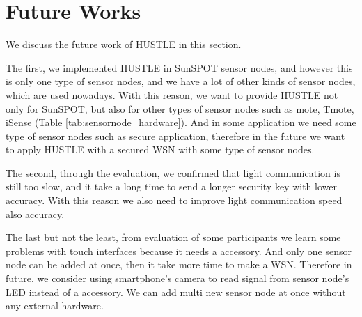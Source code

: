 \section{Future Works}\label{sec:conc_future}

We discuss the future work of HUSTLE in this section. 

The first, we implemented HUSTLE in SunSPOT sensor nodes, and however this is only one type of sensor nodes, and we have a lot of other kinds of sensor nodes, which are used nowadays. With this reason, we want to provide HUSTLE not only for SunSPOT, but also for other types of sensor nodes such as mote, Tmote, iSense (Table \ref{tab:sensornode_hardware}). And in some application we need some type of sensor nodes such as secure application, therefore in the future we want to apply HUSTLE with a secured WSN with some type of sensor nodes.

The second, through the evaluation, we confirmed that light communication is still too slow, and it take a long time to send a longer security key with lower accuracy. With this reason we also need to improve light communication speed also accuracy.

The last but not the least, from evaluation of some participants we learn some problems with touch interfaces because it needs a accessory. And only one sensor node can be added at once, then it take more time to make a WSN. Therefore in future, we consider using smartphone's camera to read signal from sensor node's LED instead of a accessory. We can add multi new sensor node at once without any external hardware.


